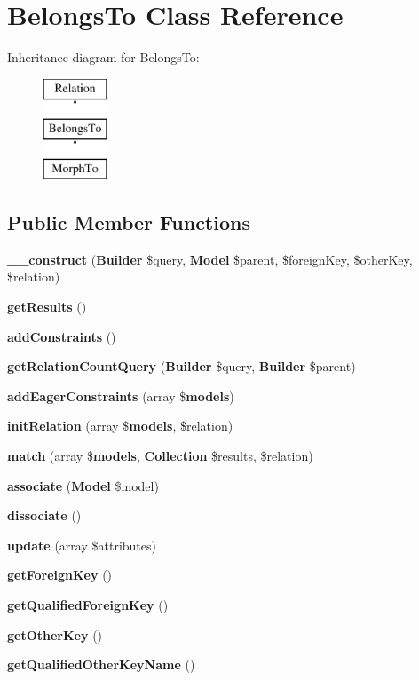 \section{Belongs\+To Class Reference}
\label{class_illuminate_1_1_database_1_1_eloquent_1_1_relations_1_1_belongs_to}
Inheritance diagram for Belongs\+To\+:\begin{figure}[H]
\begin{center}
\leavevmode
\includegraphics[height=3.000000cm]{class_illuminate_1_1_database_1_1_eloquent_1_1_relations_1_1_belongs_to}
\end{center}
\end{figure}
\subsection*{Public Member Functions}
\begin{DoxyCompactItemize}
\item 
{\bf \+\_\+\+\_\+construct} ({\bf Builder} \$query, {\bf Model} \$parent, \$foreign\+Key, \$other\+Key, \$relation)
\item 
{\bf get\+Results} ()
\item 
{\bf add\+Constraints} ()
\item 
{\bf get\+Relation\+Count\+Query} ({\bf Builder} \$query, {\bf Builder} \$parent)
\item 
{\bf add\+Eager\+Constraints} (array \${\bf models})
\item 
{\bf init\+Relation} (array \${\bf models}, \$relation)
\item 
{\bf match} (array \${\bf models}, {\bf Collection} \$results, \$relation)
\item 
{\bf associate} ({\bf Model} \$model)
\item 
{\bf dissociate} ()
\item 
{\bf update} (array \$attributes)
\item 
{\bf get\+Foreign\+Key} ()
\item 
{\bf get\+Qualified\+Foreign\+Key} ()
\item 
{\bf get\+Other\+Key} ()
\item 
{\bf get\+Qualified\+Other\+Key\+Name} ()
\end{DoxyCompactItemize}
